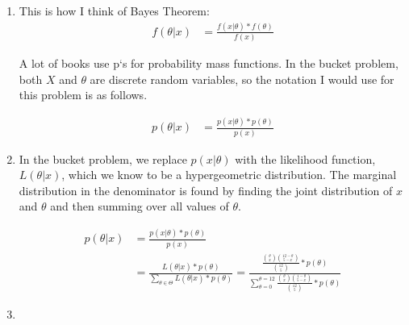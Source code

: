 \documentclass[12pt]{article}\usepackage[]{graphicx}\usepackage[]{color}
\begin{document}
\begin{doublespacing}
\begin{enumerate}
\begin{enumerate}
\end{enumerate}

\item This is how I think of Bayes Theorem:
\begin{align*}
f(\theta|x) &= \frac{f(x|\theta)*f(\theta)}{f(x)}
\end{align*}

A lot of books use p`s for probability mass functions. In the bucket problem, both $X$ and $\theta$ are discrete random variables, so the notation I would use for this problem is as follows.

\begin{align*}
p(\theta|x) &= \frac{p(x|\theta)*p(\theta)}{p(x)}
\end{align*}

\item In the bucket problem, we replace $p(x|\theta)$ with the likelihood function, $L(\theta|x)$, which we know to be a hypergeometric distribution. The marginal distribution in the denominator is found by finding the joint distribution of $x$ and $\theta$ and then summing over all values of $\theta$.

\begin{align*}
p(\theta|x) &= \frac{p(x|\theta)*p(\theta)}{p(x)} \\
            &= \frac{L(\theta|x)*p(\theta)}{\sum_{\theta \in \Theta} L(\theta|x)*p(\theta)} = \frac{\frac{{\theta \choose x} {12-\theta \choose 5-x}} {{12 \choose 5}} * p(\theta)} {\sum_{\theta=0}^{\theta=12} \frac{{\theta \choose x} {1-\theta \choose 5-x}} {{12 \choose 5}} * p(\theta)}
\end{align*}

\item \begin{enumerate}


\end{enumerate}
\end{enumerate}
\end{doublespacing}
\end{document}
